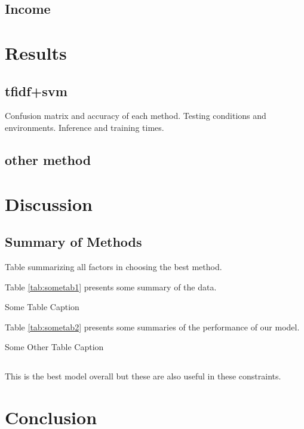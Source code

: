 \documentclass[12pt,letterpaper]{article}
\begin{document}
\subsection{Income}

\section{Results}
\subsection{tfidf+svm}
Confusion matrix and accuracy of each method. Testing conditions and environments. Inference and training times.
\subsection{other method}

\section{Discussion}
\subsection{Summary of Methods}
Table summarizing all factors in choosing the best method.

Table \ref{tab:sometab1} presents some summary of the data.

\begin{table}[htbp]
\caption{Some Table Caption}
\label{tab:sometab1}
\resizebox{0.4\linewidth}{!}{}
\end{table}

Table \ref{tab:sometab2} presents some summaries of the performance of our model.

\begin{table}[htbp]
\caption{Some Other Table Caption}
\label{tab:sometab2}
\resizebox{0.9\linewidth}{!}{}
\end{table}

\subsection{}
This is the best model overall
but these are also useful in these constraints.

\section{Conclusion}
\end{document}
